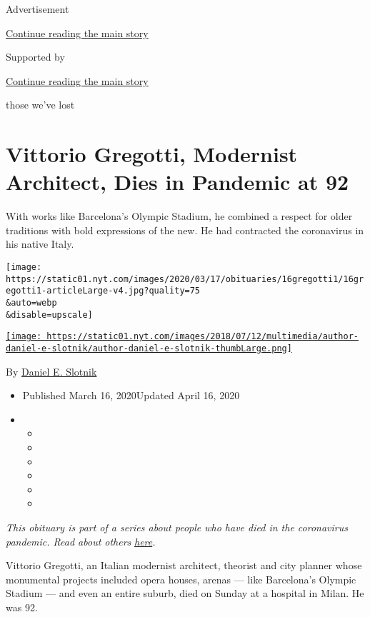 Advertisement

\protect\hyperlink{after-top}{Continue reading the main story}

Supported by

\protect\hyperlink{after-sponsor}{Continue reading the main story}

those we've lost

\hypertarget{vittorio-gregotti-modernist-architect-dies-in-pandemic-at-92}{%
\section{Vittorio Gregotti, Modernist Architect, Dies in Pandemic at
92}\label{vittorio-gregotti-modernist-architect-dies-in-pandemic-at-92}}

With works like Barcelona's Olympic Stadium, he combined a respect for
older traditions with bold expressions of the new. He had contracted the
coronavirus in his native Italy.

\texttt{[image: https://static01.nyt.com/images/2020/03/17/obituaries/16gregotti1/16gregotti1-articleLarge-v4.jpg?quality=75\\\&auto=webp\\\&disable=upscale]}

\href{https://www.nytimes.com/by/daniel-e-slotnik}{\texttt{[image: https://static01.nyt.com/images/2018/07/12/multimedia/author-daniel-e-slotnik/author-daniel-e-slotnik-thumbLarge.png]}}

By \href{https://www.nytimes.com/by/daniel-e-slotnik}{Daniel E. Slotnik}

\begin{itemize}
\item
  Published March 16, 2020Updated April 16, 2020
\item
  \begin{itemize}
  \item
  \item
  \item
  \item
  \item
  \item
  \end{itemize}
\end{itemize}

\emph{This obituary is part of a series about people who have died in
the coronavirus pandemic. Read about others}
\href{https://www.nytimes.com/series/people-who-have-died-of-the-coronavirus}{\emph{here}}\emph{.}

Vittorio Gregotti, an Italian modernist architect, theorist and city
planner whose monumental projects included opera houses, arenas --- like
Barcelona's Olympic Stadium --- and even an entire suburb, died on
Sunday at a hospital in Milan. He was 92.

